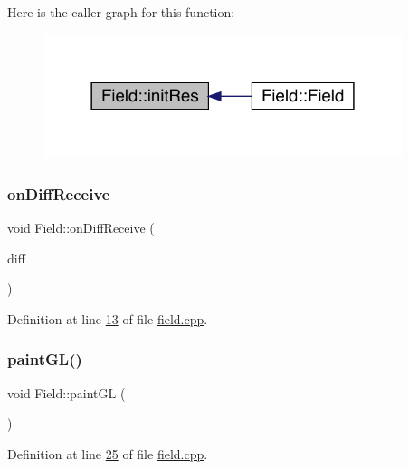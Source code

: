 Here is the caller graph for this function\+:
\nopagebreak
\begin{figure}[H]
\begin{center}
\leavevmode
\includegraphics[width=297pt]{d7/d3f/a00173_ac2d8f10e9bccfe3cf51cf534c73cecd4_icgraph}
\end{center}
\end{figure}
\mbox{\label{a00173_a407d6701413d3627ef50e9e86786b987}} 
\subsubsection{\texorpdfstring{on\+Diff\+Receive}{onDiffReceive}}
{\footnotesize\ttfamily void Field\+::on\+Diff\+Receive (\begin{DoxyParamCaption}\item[{Q\+List$<$ \hyperlink{a00141}{Diff\+Element} $\ast$$>$ $\ast$}]{diff }\end{DoxyParamCaption})\hspace{0.3cm}{\ttfamily [slot]}}



Definition at line \hyperlink{a00071_source_l00013}{13} of file \hyperlink{a00071_source}{field.\+cpp}.

\mbox{\label{a00173_a43d725e582133d23bcbebdcd7bd4a287}} 
\subsubsection{\texorpdfstring{paint\+G\+L()}{paintGL()}}
{\footnotesize\ttfamily void Field\+::paint\+GL (\begin{DoxyParamCaption}{ }\end{DoxyParamCaption})\hspace{0.3cm}{\ttfamily [protected]}}



Definition at line \hyperlink{a00071_source_l00025}{25} of file \hyperlink{a00071_source}{field.\+cpp}.

